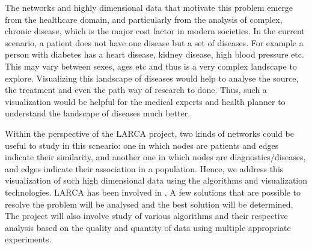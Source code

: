 \par The networks and highly dimensional data that motivate this problem emerge from the healthcare domain, and particularly from the analysis of complex, chronic disease, which is the major cost factor in modern societies. In the current scenario, a patient does not have one disease but a
set of diseases. For example a person with diabetes has a heart disease, kidney disease, high blood
pressure etc. This may vary between sexes, ages etc and thus is a very complex landscape to
explore. Visualizing this landscape of diseases would help to analyse the source, the treatment
and even the path way of research to done. Thus, such a visualization would be helpful for the
medical experts and health planner to understand the landscape of diseases much better.
\par Within the perspective of the LARCA project, two kinds of networks could be useful to study in this scneario: one in which nodes are patients and edges indicate their similarity, and another one in which nodes are diagnostics/diseases, and edges indicate their association in a population. Hence, we address this visualization of such high dimensional data using the algorithms and visualization technologies. LARCA has been involved in  \cite{sirlarca} . A few solutions that are possible to resolve the problem will be analysed and the best solution will be determined. The project will also involve study of various algorithms and their respective analysis based on the quality and quantity of data using multiple appropriate experiments. 



